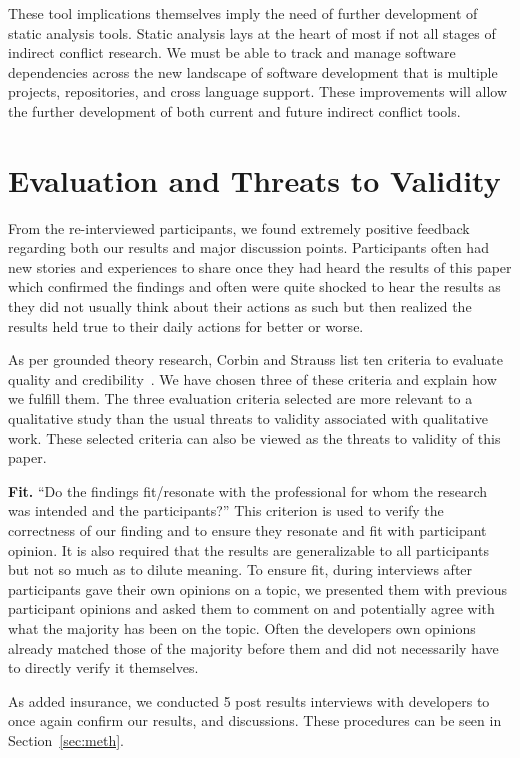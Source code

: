 \documentclass[conference]{IEEEtran}
\begin{document}
These tool implications themselves imply the need of further development of static analysis tools. Static
analysis lays at the heart of most if not all stages of indirect conflict research. We must be able to track and manage
software dependencies across the new landscape of software development that is multiple projects, repositories, and cross
language support. These improvements will allow the further development of both current and future indirect conflict
tools.

\section{Evaluation and Threats to Validity}
\label{sec:eval}

From the re-interviewed participants, we found extremely positive feedback regarding both our results and major discussion
points. Participants often had new stories and experiences to share once they had heard the results of this paper which
confirmed the findings and often were quite shocked to hear the results as they did not usually think about their actions
as such but then realized the results held true to their daily actions for better or worse.

As per grounded theory research, Corbin and Strauss list ten criteria to evaluate quality and credibility~\cite{Corbin:1998:SP}.
We have chosen three of these criteria and explain how we fulfill them. The three evaluation criteria selected are more relevant
to a qualitative study than the usual threats to validity associated with qualitative work. These selected criteria can also
be viewed as the threats to validity of this paper.

{\bfseries Fit.} ``Do the findings fit/resonate with the professional for whom the research was intended and the participants?'' This
criterion is used to verify the correctness of our finding and to ensure they resonate and fit with participant opinion. It is also
required that the results are generalizable to all participants but not so much as to dilute meaning. To ensure fit, during interviews
after participants gave their own opinions on a topic, we presented them with previous participant opinions and asked them to comment
on and potentially agree with what the majority has been on the topic. Often the developers own opinions already matched those of
the majority before them and did not necessarily have to directly verify it themselves.

As added insurance, we conducted 5 post results interviews with developers to once again confirm our results, and discussions. These
procedures can be seen in Section~\ref{sec:meth}.
\end{document}
